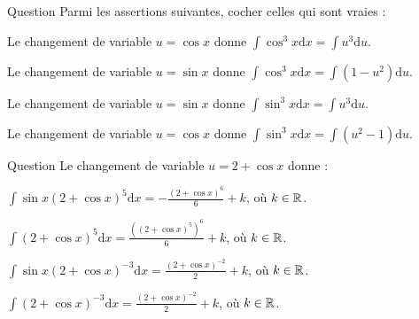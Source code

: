 \begin{multi}[multiple,feedback=
{On a : \(\cos ^3x=(1-\sin ^2x)\cos x\). Donc, avec \(u=\sin x\), on a : \(\mathrm{d}u=\cos x\, \mathrm{d}x\) et
\[\int \cos ^3x\mathrm{d}x=\int (1-\sin ^2x)\cos x\mathrm{d}x=\int (1-u^2)\mathrm{d}u.\]
De m\^eme, on a : \(\sin ^3x=(1-\cos ^2x)\sin x\). Donc, avec \(u=\cos x\), on a : \(\mathrm{d}u=-\sin x\mathrm{d}x\) et
\[\int \cos ^3x\mathrm{d}x=\int (1-\cos ^2x)\sin x\mathrm{d}x=-\int (1-u^2)\mathrm{d}u.\]
}]{Question}
Parmi les assertions suivantes, cocher celles qui sont vraies :

    \item Le changement de variable \(u=\cos x\) donne \(\displaystyle \int \cos ^3x\mathrm{d}x=\int u^3\mathrm{d}u\).
    \item* Le changement de variable \(u=\sin x\) donne \(\displaystyle \int \cos ^3x\mathrm{d}x=\int (1-u^2)\mathrm{d}u\).
    \item Le changement de variable \(u=\sin x\) donne \(\displaystyle \int \sin ^3x\mathrm{d}x=\int u^3\mathrm{d}u\).
    \item* Le changement de variable \(u=\cos x\) donne \(\displaystyle \int \sin ^3x\mathrm{d}x=\int (u^2-1)\mathrm{d}u\).
\end{multi}


\begin{multi}[multiple,feedback=
{Avec \(u=2+\cos x\), on a : \(\mathrm{d}u=-\sin x\, \mathrm{d}x\). D'où
\[\int \sin x(2+\cos x)^5\mathrm{d}x=-\int u^5\mathrm{d}u=-\frac{u^6}{6}+k,\; k\in \Rr,\]
et
\[\int \sin x(2+\cos x)^{-3}\mathrm{d}x=-\int u^{-3}\mathrm{d}u=\frac{u^{-2}}{2}+k,\; k\in \Rr.\]
}]{Question}
Le changement de variable \(u=2+\cos x\) donne :

    \item* \(\displaystyle \int \sin x(2+\cos x)^5\mathrm{d}x=-\frac{(2+\cos x)^6}{6}+k\), où \(k\in \mathbb{R}\).
    \item \(\displaystyle \int (2+\cos x)^5\mathrm{d}x=\frac{((2+\cos x)^5)^6}{6}+k\), où \(k\in \mathbb{R}\).
    \item* \(\displaystyle \int \sin x\left(2+\cos x\right)^{-3}\mathrm{d}x=\frac{\left(2+\cos x\right)^{-2}}{2}+k\), où \(k\in \mathbb{R}\).
    \item \(\displaystyle \int \left(2+\cos x\right)^{-3}\mathrm{d}x=\frac{\left(2+\cos x\right)^{-2}}{2}+k\), où \(k\in \mathbb{R}\).
\end{multi}



